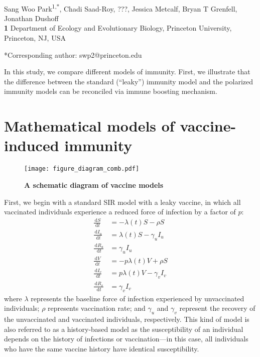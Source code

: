 \documentclass[12pt]{article}
\date{\today}
\newcommand{\dd}[1]{\ensuremath{\, \mathrm{d}#1}}
\begin{document}
\begin{flushleft}{
	\Large
	\textbf{}
}
\newline
\\
Sang Woo Park\textsuperscript{1,*}, Chadi Saad-Roy, ???, Jessica Metcalf, Bryan T Grenfell, Jonathan Dushoff
\\
\bigskip
\textbf{1} Department of Ecology and Evolutionary Biology, Princeton University, Princeton, NJ, USA
\\
\bigskip

*Corresponding author: swp2@princeton.edu
\end{flushleft}

In this study, we compare different models of immunity.
First, we illustrate that the difference between the standard (``leaky'') immunity model and the polarized immunity models can be reconciled via immune boosting mechanism.



\section{Mathematical models of vaccine-induced immunity}

\begin{figure}[!tp]
\texttt{[image: figure\_diagram\_comb.pdf]}
\caption{
\textbf{A schematic diagram of vaccine models}
}
\end{figure}

First, we begin with a standard SIR model with a leaky vaccine, in which all vaccinated individuals experience a reduced force of infection by a factor of $p$:
\begin{align}
\frac{\dd S}{\dd t} &= - \lambda(t) S - \rho S \\
\frac{\dd I_u}{\dd t} &= \lambda(t) S - \gamma_u I_u \\
\frac{\dd R_u}{\dd t} &= \gamma_u I_u \\
\frac{\dd V}{\dd t} &= - p \lambda(t) V + \rho S \\
\frac{\dd I_v}{\dd t} &= p \lambda(t) V - \gamma_v I_v \\
\frac{\dd R_v}{\dd t} &= \gamma_v I_v
\end{align}
where $\lambda$ represents the baseline force of infection experienced by unvaccinated individuals; $\rho$ represents vaccination rate; and $\gamma_u$ and $\gamma_v $ represent the recovery of the unvaccinated and vaccinated individuals, respectively.
This kind of model is also referred to as a history-based model as the susceptibility of an individual depends on the history of infections or vaccination---in this case, all individuals who have the same vaccine history have identical susceptibility.
\end{document}
